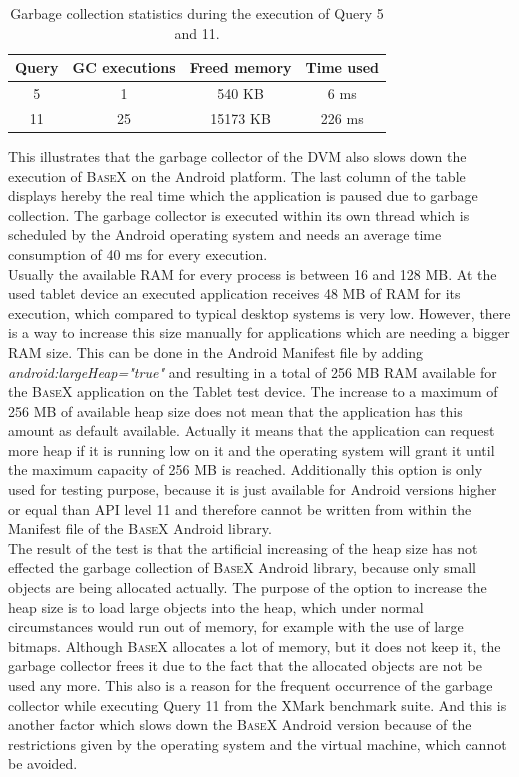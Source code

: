 \begin{table}[htpb]
	\centering
	\begin{tabular}{|c|c|c|c|}
		\hline
		Query&GC executions&Freed memory&Time used\\
		\hline
		5&1&540 KB&6 ms\\
		\hline
		11&25&15173 KB&226 ms\\
		\hline
	\end{tabular}
	\caption{Garbage collection statistics during the execution of Query 5 and 11.}
	\label{tab:gc-stats}
\end{table}

This illustrates that the garbage collector of the DVM also slows down the execution of \textsc{BaseX} on the Android platform.
The last column of the table displays hereby the real time which the application is paused due to garbage collection.
The garbage collector is executed within its own thread which is scheduled by the Android operating system and needs an average time consumption of 40 ms for every execution.\\
Usually the available RAM for every process is between 16 and 128 MB.
At the used tablet device an executed application receives 48 MB of RAM for its execution, which compared to typical desktop systems is very low.
However, there is a way to increase this size manually for applications which are needing a bigger RAM size.
This can be done in the Android Manifest file by adding \textit{android:largeHeap="true"} and resulting in a total of 256 MB RAM available for the \textsc{BaseX} application on the Tablet test device.
The increase to a maximum of 256 MB of available heap size does not mean that the application has this amount as default available.
Actually it means that the application can request more heap if it is running low on it and the operating system will grant it until the maximum capacity of 256 MB is reached.
Additionally this option is only used for testing purpose, because it is just available for Android versions higher or equal than API level 11 and therefore cannot be written from within the Manifest file of the \textsc{BaseX} Android library.\\
The result of the test is that the artificial increasing of the heap size has not effected the garbage collection of \textsc{BaseX} Android library, because only small objects are being allocated actually.
The purpose of the option to increase the heap size is to load large objects into the heap, which under normal circumstances would run out of memory, for example with the use of large bitmaps.
Although \textsc{BaseX} allocates a lot of memory, but it does not keep it, the garbage collector frees it due to the fact that the allocated objects are not be used any more.
This also is a reason for the frequent occurrence of the garbage collector while executing Query 11 from the XMark benchmark suite.
And this is another factor which slows down the \textsc{BaseX} Android version because of the restrictions given by the operating system and the virtual machine, which cannot be avoided.



